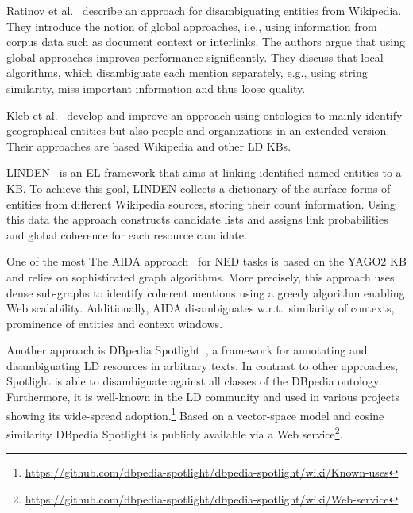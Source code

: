 
Ratinov et al.~\cite{rat:rot} describe an approach for disambiguating entities from Wikipedia. 
They introduce the notion of global approaches, i.e., using information from corpus data such as document context or interlinks. 
The authors argue that using global approaches improves performance significantly. 
They discuss that local algorithms, which disambiguate each mention separately, e.g., using string similarity, miss important information and thus loose quality. 

Kleb et al.~\cite{Kleb11WIMS,KlebESWC10} develop and improve an approach using ontologies to mainly identify geographical entities but also people and organizations in an extended version. 
Their approaches are based Wikipedia and other \ac{LD} \ac{KB}s. 

LINDEN~\cite{LINDEN} is an \ac{EL} framework that aims at linking identified named entities to a \ac{KB}.
To achieve this goal, LINDEN collects a dictionary of the surface forms of entities from different Wikipedia sources, storing their count information.
Using this data the approach constructs candidate lists and assigns link probabilities and global coherence for each resource candidate.

One of the most 
The AIDA approach~\cite{AIDA} for \ac{NED} tasks is based on the YAGO2 \ac{KB} and relies on sophisticated graph algorithms. 
More precisely, this approach uses dense sub-graphs to identify coherent mentions using a greedy algorithm enabling Web scalability. 
Additionally, AIDA disambiguates w.r.t.~similarity of contexts, prominence of entities and context windows.

Another approach is DBpedia Spotlight~\cite{spotlight}, a framework for annotating and disambiguating \ac{LD} resources in arbitrary texts.
In contrast to other approaches, Spotlight is able to disambiguate against all classes of the DBpedia ontology.
Furthermore, it is well-known in the \ac{LD} community and used in various projects showing its wide-spread adoption.\footnote{\url{https://github.com/dbpedia-spotlight/dbpedia-spotlight/wiki/Known-uses}}
Based on a vector-space model and cosine similarity DBpedia Spotlight is publicly available via a Web service\footnote{\url{https://github.com/dbpedia-spotlight/dbpedia-spotlight/wiki/Web-service}}.

